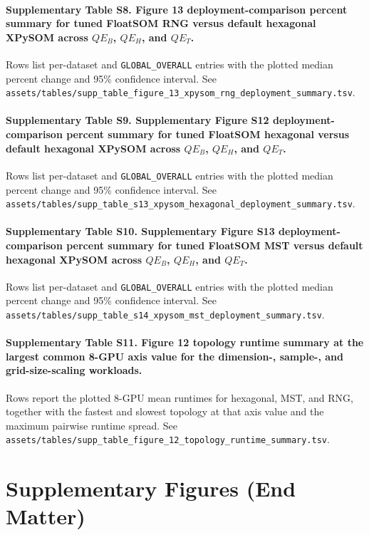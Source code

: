 \documentclass[10pt]{article} %
\begin{document}
\paragraph*{Supplementary Table S8. Figure 13 deployment-comparison percent summary for tuned FloatSOM RNG versus default hexagonal XPySOM across $QE_B$, $QE_H$, and $QE_T$.}
Rows list per-dataset and \texttt{GLOBAL\_OVERALL} entries with the plotted median percent change and 95\% confidence interval. See \texttt{assets/tables/supp\_table\_figure\_13\_xpysom\_rng\_deployment\_summary.tsv}.

\paragraph*{Supplementary Table S9. Supplementary Figure S12 deployment-comparison percent summary for tuned FloatSOM hexagonal versus default hexagonal XPySOM across $QE_B$, $QE_H$, and $QE_T$.}
Rows list per-dataset and \texttt{GLOBAL\_OVERALL} entries with the plotted median percent change and 95\% confidence interval. See \texttt{assets/tables/supp\_table\_s13\_xpysom\_hexagonal\_deployment\_summary.tsv}.

\paragraph*{Supplementary Table S10. Supplementary Figure S13 deployment-comparison percent summary for tuned FloatSOM MST versus default hexagonal XPySOM across $QE_B$, $QE_H$, and $QE_T$.}
Rows list per-dataset and \texttt{GLOBAL\_OVERALL} entries with the plotted median percent change and 95\% confidence interval. See \texttt{assets/tables/supp\_table\_s14\_xpysom\_mst\_deployment\_summary.tsv}.

\paragraph*{Supplementary Table S11. Figure 12 topology runtime summary at the largest common 8-GPU axis value for the dimension-, sample-, and grid-size-scaling workloads.}
Rows report the plotted 8-GPU mean runtimes for hexagonal, MST, and RNG, together with the fastest and slowest topology at that axis value and the maximum pairwise runtime spread. See \texttt{assets/tables/supp\_table\_figure\_12\_topology\_runtime\_summary.tsv}.

\section{Supplementary Figures (End Matter)}
\setcounter{figure}{0}
\renewcommand{\figurename}{Supplementary Figure}
\renewcommand{\thefigure}{S\arabic{figure}}
\renewcommand{\theHfigure}{supplementaryfigure.\arabic{figure}}
\end{document}
